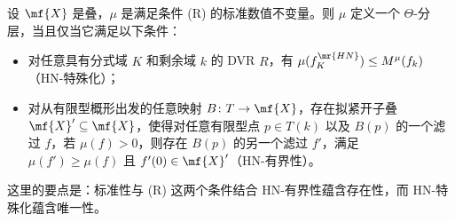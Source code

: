 \begin{thm}
    设 \(\mf{X}\) 是叠，\(\mu\) 是满足条件 (R) 的标准数值不变量。则 \(\mu\) 定义一个 \(\Theta\)-分层，当且仅当它满足以下条件：
    \begin{itemize}
        \item 对任意具有分式域 \(K\) 和剩余域 \(k\) 的 DVR \(R\)，有 \(\mu(f_K^{\mr{HN}}) \leq M^{\mu}(f_k)\)（HN-特殊化）；
        \item 对从有限型概形出发的任意映射 \(B \colon T \to \mf{X}\)，存在拟紧开子叠 \(\mf{X}' \subseteq \mf{X}\)，使得对任意有限型点 \(p \in T(k)\) 以及 \(B(p)\) 的一个滤过 \(f\)，若 \(\mu(f) > 0\)，则存在 \(B(p)\) 的另一个滤过 \(f'\)，满足 \(\mu(f') \geq \mu(f)\) 且 \(f'(0) \in \mf{X}'\)（HN-有界性）。
    \end{itemize}
\end{thm}

这里的要点是：标准性与 (R) 这两个条件结合 HN-有界性蕴含存在性，而 HN-特殊化蕴含唯一性。



